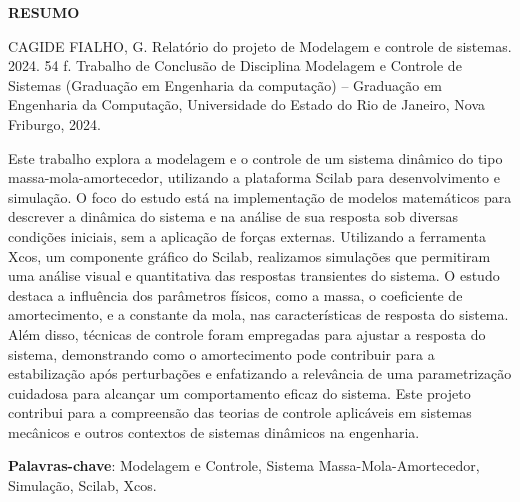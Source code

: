\begin{titlepage}
    \thispagestyle{empty} %

    \begin{center}
        \textbf{\Large RESUMO}
    \end{center}


    \vspace{1cm} %

    \noindent CAGIDE FIALHO, G. Relatório do projeto de Modelagem
    e controle de sistemas. 2024. 54 f. Trabalho de Conclusão de Disciplina Modelagem e Controle de Sistemas (Graduação em
    Engenharia da computação) – Graduação em Engenharia da Computação, Universidade
    do Estado do Rio de Janeiro, Nova Friburgo, 2024.

    \vspace{0.4cm} %

    Este trabalho explora a modelagem e o controle de um sistema dinâmico do tipo massa-mola-amortecedor, utilizando a plataforma Scilab para desenvolvimento e simulação. O foco do estudo está na implementação de modelos matemáticos para descrever a dinâmica do sistema e na análise de sua resposta sob diversas condições iniciais, sem a aplicação de forças externas. Utilizando a ferramenta Xcos, um componente gráfico do Scilab, realizamos simulações que permitiram uma análise visual e quantitativa das respostas transientes do sistema. O estudo destaca a influência dos parâmetros físicos, como a massa, o coeficiente de amortecimento, e a constante da mola, nas características de resposta do sistema. Além disso, técnicas de controle foram empregadas para ajustar a resposta do sistema, demonstrando como o amortecimento pode contribuir para a estabilização após perturbações e enfatizando a relevância de uma parametrização cuidadosa para alcançar um comportamento eficaz do sistema. Este projeto contribui para a compreensão das teorias de controle aplicáveis em sistemas mecânicos e outros contextos de sistemas dinâmicos na engenharia.
    \vspace{0.4cm} %

    \textbf{Palavras-chave}: Modelagem e Controle, Sistema Massa-Mola-Amortecedor, Simulação, Scilab, Xcos.
\end{titlepage}
